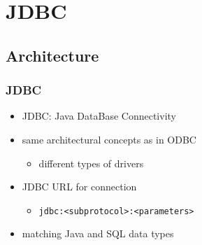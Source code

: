 \documentclass[dvipsnames]{beamer}
\theoremstyle{plain}
\begin{document}
\section{JDBC}

\subsection{Architecture}

\begin{frame}
  \frametitle{JDBC}

  \begin{itemize}
    \item \alert{JDBC}: Java DataBase Connectivity

    \pause
    \item same architectural concepts as in ODBC
    \begin{itemize}
      \item different types of drivers
    \end{itemize}

    \pause
    \item JDBC URL for connection
    \begin{itemize}
      \item \lstinline!jdbc:<subprotocol>:<parameters>!
    \end{itemize}

    \pause
    \item matching Java and SQL data types
  \end{itemize}
\end{frame}
\end{document}
